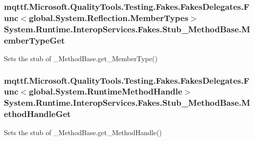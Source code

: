 \hypertarget{class_system_1_1_runtime_1_1_interop_services_1_1_fakes_1_1_stub___method_base_acb636e0afdd7a54880837e2d1bf7d725}{
\subsubsection[{Member\-Type\-Get}]{\setlength{\rightskip}{0pt plus 5cm}mqttf.\-Microsoft.\-Quality\-Tools.\-Testing.\-Fakes.\-Fakes\-Delegates.\-Func$<$global.\-System.\-Reflection.\-Member\-Types$>$ System.\-Runtime.\-Interop\-Services.\-Fakes.\-Stub\-\_\-\-Method\-Base.\-Member\-Type\-Get}}\label{class_system_1_1_runtime_1_1_interop_services_1_1_fakes_1_1_stub___method_base_acb636e0afdd7a54880837e2d1bf7d725}


Sets the stub of \-\_\-\-Method\-Base.\-get\-\_\-\-Member\-Type()

\hypertarget{class_system_1_1_runtime_1_1_interop_services_1_1_fakes_1_1_stub___method_base_a5881fc1eae5cc7013eaaa3f69714cce9}{
\subsubsection[{Method\-Handle\-Get}]{\setlength{\rightskip}{0pt plus 5cm}mqttf.\-Microsoft.\-Quality\-Tools.\-Testing.\-Fakes.\-Fakes\-Delegates.\-Func$<$global.\-System.\-Runtime\-Method\-Handle$>$ System.\-Runtime.\-Interop\-Services.\-Fakes.\-Stub\-\_\-\-Method\-Base.\-Method\-Handle\-Get}}\label{class_system_1_1_runtime_1_1_interop_services_1_1_fakes_1_1_stub___method_base_a5881fc1eae5cc7013eaaa3f69714cce9}


Sets the stub of \-\_\-\-Method\-Base.\-get\-\_\-\-Method\-Handle()

